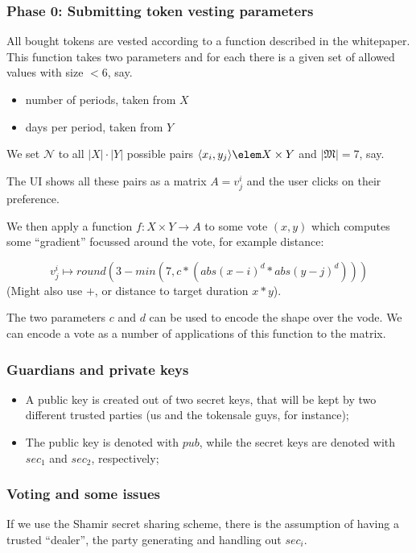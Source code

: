 \documentclass[submission, copyright,creativecommons,sharealike,noncommercial]{eptcs}
\begin{document}
		\subsubsection{Phase 0: Submitting token vesting parameters}
			All bought tokens are vested according to a function described in the
			whitepaper. This function takes two parameters and for each
			there is a given set of allowed values with size $< 6$, say.

			\begin{itemize}
			\item number of periods, taken from $X$
			\item days per period, taken from $Y$
			\end{itemize}


			We set $\mathcal{N}$ to all $|X|\cdot|Y|$ possible pairs
			$\langle x_i, y_j \rangle \elem X \times Y$ and
			$|\mathfrak{M}|=7$, say.

			The UI shows all these pairs as a matrix $A=v^i_j$
			and the user clicks on their preference.

			We then apply a function $f: X \times Y \to A$ to
			some vote $(x,y)$ which computes some ``gradient''
			focussed around the vote, for example distance:

			\[
			v^i_j \mapsto round(3 - min(7, c*(abs(x-i)^d * abs(y-j)^d)))
			\]
			(Might also use $+$, or distance to target duration $x*y$).

			The two parameters $c$ and $d$ can be used to encode the
			shape over the vode.  We can encode a vote as a number of
			applications of this function to the matrix.

		\subsubsection{Guardians and private keys}
			\begin{itemize}
				\item A public key is created out of two secret keys, that will be kept by two different trusted parties (us and the tokensale guys, for instance);
				
				\item The public key is denoted with $pub$, while the secret keys are denoted with $sec_1$ and $sec_2$, respectively;
			\end{itemize}

		\subsubsection{Voting and some issues}
			If we use the Shamir secret sharing scheme, there is the
			assumption of having a trusted ``dealer'',
			the party generating and handling out $sec_i$.
\end{document}

